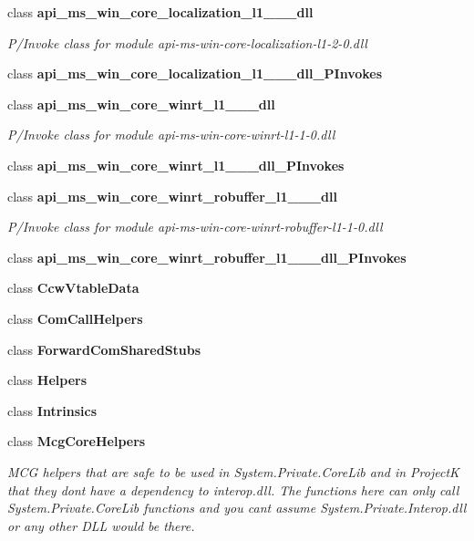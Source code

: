 \begin{DoxyCompactItemize}
\item 
class {\bfseries api\+\_\+ms\+\_\+win\+\_\+core\+\_\+localization\+\_\+l1\+\_\+\_\+\_\+dll}
\begin{DoxyCompactList}\small\item\em P/\+Invoke class for module \textquotesingle{}api-\/ms-\/win-\/core-\/localization-\/l1-\/2-\/0.\+dll\textquotesingle{} \end{DoxyCompactList}\item 
class {\bfseries api\+\_\+ms\+\_\+win\+\_\+core\+\_\+localization\+\_\+l1\+\_\+\_\+\_\+dll\+\_\+\+P\+Invokes}
\item 
class {\bfseries api\+\_\+ms\+\_\+win\+\_\+core\+\_\+winrt\+\_\+l1\+\_\+\_\+\_\+dll}
\begin{DoxyCompactList}\small\item\em P/\+Invoke class for module \textquotesingle{}api-\/ms-\/win-\/core-\/winrt-\/l1-\/1-\/0.\+dll\textquotesingle{} \end{DoxyCompactList}\item 
class {\bfseries api\+\_\+ms\+\_\+win\+\_\+core\+\_\+winrt\+\_\+l1\+\_\+\_\+\_\+dll\+\_\+\+P\+Invokes}
\item 
class {\bfseries api\+\_\+ms\+\_\+win\+\_\+core\+\_\+winrt\+\_\+robuffer\+\_\+l1\+\_\+\_\+\_\+dll}
\begin{DoxyCompactList}\small\item\em P/\+Invoke class for module \textquotesingle{}api-\/ms-\/win-\/core-\/winrt-\/robuffer-\/l1-\/1-\/0.\+dll\textquotesingle{} \end{DoxyCompactList}\item 
class {\bfseries api\+\_\+ms\+\_\+win\+\_\+core\+\_\+winrt\+\_\+robuffer\+\_\+l1\+\_\+\_\+\_\+dll\+\_\+\+P\+Invokes}
\item 
class {\bfseries Ccw\+Vtable\+Data}
\item 
class {\bfseries Com\+Call\+Helpers}
\item 
class {\bfseries Forward\+Com\+Shared\+Stubs}
\item 
class {\bfseries Helpers}
\item 
class {\bfseries Intrinsics}
\item 
class {\bfseries Mcg\+Core\+Helpers}
\begin{DoxyCompactList}\small\item\em M\+CG helpers that are safe to be used in System.\+Private.\+Core\+Lib and in ProjectK that they don\textquotesingle{}t have a dependency to interop.\+dll. The functions here can only call System.\+Private.\+Core\+Lib functions and you can\textquotesingle{}t assume System.\+Private.\+Interop.\+dll or any other D\+LL would be there. \end{DoxyCompactList}\item 

\end{DoxyCompactItemize}
